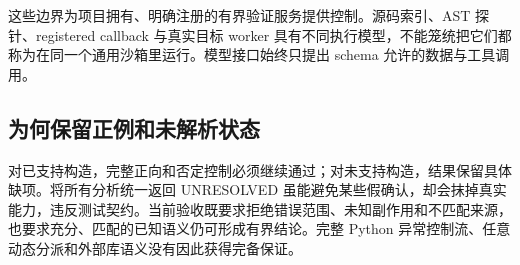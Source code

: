 这些边界为项目拥有、明确注册的有界验证服务提供控制。源码索引、AST 探针、registered callback 与真实目标 worker 具有不同执行模型，不能笼统把它们都称为在同一个通用沙箱里运行。模型接口始终只提出 schema 允许的数据与工具调用。


\subsection{为何保留正例和未解析状态}
对已支持构造，完整正向和否定控制必须继续通过；对未支持构造，结果保留具体缺项。将所有分析统一返回 UNRESOLVED 虽能避免某些假确认，却会抹掉真实能力，违反测试契约。当前验收既要求拒绝错误范围、未知副作用和不匹配来源，也要求充分、匹配的已知语义仍可形成有界结论。完整 Python 异常控制流、任意动态分派和外部库语义没有因此获得完备保证。
